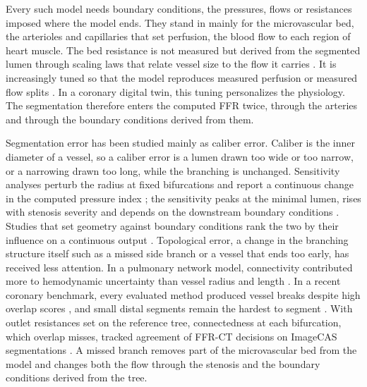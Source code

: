 \documentclass[journal,twoside,web]{ieeecolor}
\begin{document}
Every such model needs boundary conditions, the pressures, flows or resistances imposed where the model ends. They
stand in mainly for the microvascular bed, the arterioles and capillaries that set perfusion, the blood flow to each region of heart
muscle. The bed resistance is not measured but derived from the segmented lumen through
scaling laws that relate vessel size to the flow it carries \cite{murray1926,kim2010}. It is increasingly tuned so that the model reproduces measured perfusion \cite{menon2024} or measured flow splits \cite{arminio2026}. In a coronary digital twin, this tuning personalizes the physiology. The segmentation therefore enters the computed FFR twice, through the arteries and through the boundary conditions derived from them.

Segmentation error has been studied mainly as caliber error. Caliber is the inner diameter of a vessel, so a caliber error is a lumen drawn too wide or too narrow, or a narrowing drawn too long, while the branching is unchanged. Sensitivity analyses perturb the radius at fixed bifurcations and report a continuous change in the computed pressure index \cite{sankaran2015tmi,sankaran2015cmame,fernandez2024,dalmaso2025}; the sensitivity peaks at the minimal lumen, rises with stenosis severity \cite{fernandez2024} and depends on the downstream boundary conditions \cite{sankaran2015tmi}. Studies that set geometry against
boundary conditions rank the two by their influence on a continuous output \cite{sankaran2016,tanade2022,korte2023}. Topological error, a change in the branching structure itself such as a missed side branch or a vessel that ends too early, has received less attention. In a pulmonary network model, connectivity contributed more to hemodynamic uncertainty than vessel radius and
length \cite{colebank2019}. In a recent coronary benchmark, every evaluated method produced vessel breaks despite high overlap scores \cite{bransby2026}, and small distal segments remain the hardest to segment
\cite{chen2025}. With outlet resistances set on the reference tree, connectedness at each bifurcation, which overlap misses, tracked agreement of FFR-CT decisions on ImageCAS segmentations \cite{owusu2026}. A missed branch removes part of the microvascular bed from the model and changes both the flow
through the stenosis and the boundary conditions derived from the tree.
\end{document}
